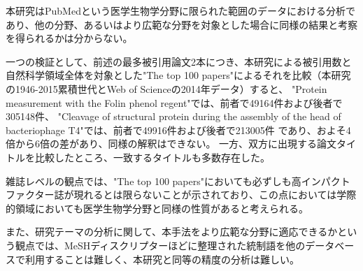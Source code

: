 本研究はPubMedという医学生物学分野に限られた範囲のデータにおける分析であり、他の分野、あるいはより広範な分野を対象とした場合に同様の結果と考察を得られるかは分からない。

一つの検証として、前述の最多被引用論文2本につき、本研究による被引用数と自然科学領域全体を対象とした"The top 100 papers"によるそれを比較（本研究の1946-2015累積世代とWeb of Scienceの2014年データ）すると、
"Protein measurement with the Folin phenol regent"では、前者で49164件および後者で305148件、
"Cleavage of structural protein during the assembly of the head of bacteriophage T4"では、前者で49916件および後者で213005件
であり、およそ4倍から6倍の差があり、同様の解釈はできない。
一方、双方に出現する論文タイトルを比較したところ、一致するタイトルも多数存在した。

雑誌レベルの観点では、"The top 100 papers"においても必ずしも高インパクトファクター誌が現れるとは限らないことが示されており、この点においては学際的領域においても医学生物学分野と同様の性質があると考えられる。

また、研究テーマの分析に関して、本手法をより広範な分野に適応できるかという観点では、MeSHディスクリプターほどに整理された統制語を他のデータベースで利用することは難しく、本研究と同等の精度の分析は難しい。

